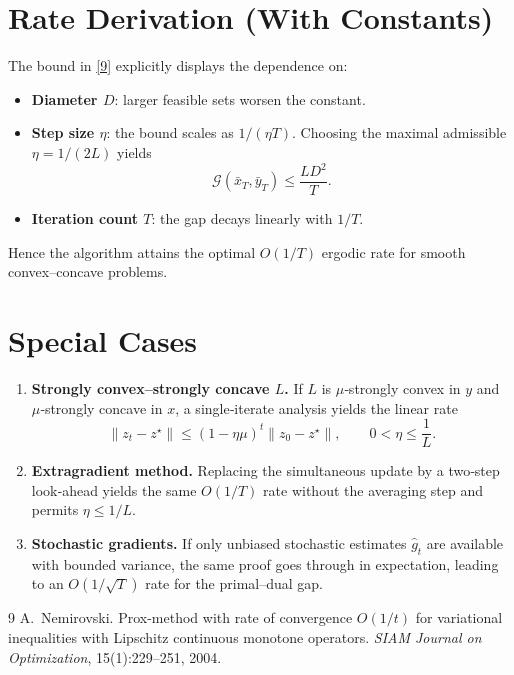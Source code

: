 \documentclass{article}
\begin{document}
\section*{Rate Derivation (With Constants)}
The bound in \eqref{9} explicitly displays the dependence on:
\begin{itemize}
\item \textbf{Diameter $D$}: larger feasible sets worsen the constant.
\item \textbf{Step size $\eta$}: the bound scales as $1/(\eta T)$. Choosing the maximal admissible $\eta=1/(2L)$ yields
\[
\mathcal{G}(\bar x_{T},\bar y_{T})\le \frac{L D^{2}}{T}.
\]
\item \textbf{Iteration count $T$}: the gap decays linearly with $1/T$.
\end{itemize}
Hence the algorithm attains the optimal $O(1/T)$ ergodic rate for smooth convex–concave problems.

\section*{Special Cases}
\begin{enumerate}
\item \textbf{Strongly convex–strongly concave $L$.} If $L$ is $\mu$‑strongly convex in $y$ and $\mu$‑strongly concave in $x$, a single‑iterate analysis yields the linear rate
\[
\|z_{t}-z^{\star}\|\le (1-\eta\mu)^{t}\|z_{0}-z^{\star}\|,
\qquad 0<\eta\le \frac{1}{L}.
\]
\item \textbf{Extragradient method.} Replacing the simultaneous update by a two‑step look‑ahead yields the same $O(1/T)$ rate without the averaging step and permits $\eta\le 1/L$.
\item \textbf{Stochastic gradients.} If only unbiased stochastic estimates $\hat g_{t}$ are available with bounded variance, the same proof goes through in expectation, leading to an $O(1/\sqrt{T})$ rate for the primal–dual gap.
\end{enumerate}

\begin{thebibliography}{9}
A.~Nemirovski.
\newblock Prox-method with rate of convergence $O(1/t)$ for variational inequalities with Lipschitz continuous monotone operators.
\newblock \emph{SIAM Journal on Optimization}, 15(1):229–251, 2004.
\end{thebibliography}
\end{document}
